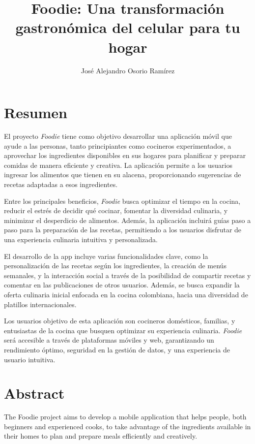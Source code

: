 \documentclass[a4paper,12pt]{article}
\title{\textbf{Foodie: Una transformación gastronómica del celular para tu hogar}}
\author{José Alejandro Osorio Ramírez}
\date{}
\begin{document}
\maketitle

\section*{Resumen}

El proyecto \textit{Foodie} tiene como objetivo desarrollar una aplicación móvil que ayude a las personas, tanto principiantes como cocineros experimentados, a aprovechar los ingredientes disponibles en sus hogares para planificar y preparar comidas de manera eficiente y creativa. La aplicación permite a los usuarios ingresar los alimentos que tienen en su alacena, proporcionando sugerencias de recetas adaptadas a esos ingredientes.

Entre los principales beneficios, \textit{Foodie} busca optimizar el tiempo en la cocina, reducir el estrés de decidir qué cocinar, fomentar la diversidad culinaria, y minimizar el desperdicio de alimentos. Además, la aplicación incluirá guías paso a paso para la preparación de las recetas, permitiendo a los usuarios disfrutar de una experiencia culinaria intuitiva y personalizada.

El desarrollo de la app incluye varias funcionalidades clave, como la personalización de las recetas según los ingredientes, la creación de menús semanales, y la interacción social a través de la posibilidad de compartir recetas y comentar en las publicaciones de otros usuarios. Además, se busca expandir la oferta culinaria inicial enfocada en la cocina colombiana, hacia una diversidad de platillos internacionales.

Los usuarios objetivo de esta aplicación son cocineros domésticos, familias, y entusiastas de la cocina que busquen optimizar su experiencia culinaria. \textit{Foodie} será accesible a través de plataformas móviles y web, garantizando un rendimiento óptimo, seguridad en la gestión de datos, y una experiencia de usuario intuitiva.

\section*{Abstract}
The Foodie project aims to develop a mobile application that helps people, both beginners and experienced cooks, to take advantage of the ingredients available in their homes to plan and prepare meals efficiently and creatively.
\end{document}
